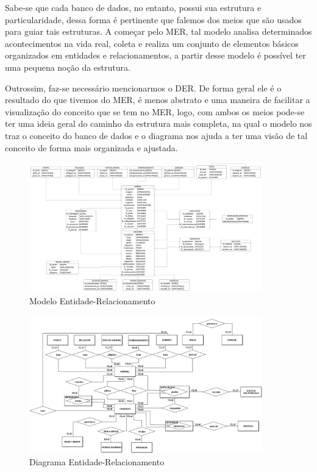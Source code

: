 Sabe-se que cada banco de dados, no entanto, possui sua estrutura e particularidade, dessa forma é pertinente que falemos dos meios que são usados para guiar tais estruturas. A começar pelo \ac{MER}, tal modelo analisa determinados acontecimentos na vida real, coleta e realiza um conjunto de elementos básicos organizados em entidades e relacionamentos, a partir desse modelo é possível ter uma pequena noção da estrutura.

Outrossim, faz-se necessário mencionarmos o \ac{DER}. De forma geral ele é o resultado do que tivemos do \ac{MER}, é menos abstrato e uma maneira de facilitar a visualização do conceito que se tem no \ac{MER}, logo, com ambos os meios pode-se ter uma ideia geral do caminho da estrutura mais completa, na qual o modelo nos traz o conceito do banco de dados e o diagrama nos ajuda a ter uma visão de tal conceito de forma mais organizada e ajustada.

\begin{figure}
    \centering
	\caption{\label{mer}Modelo Entidade-Relacionamento}
	\includegraphics[width=0.9\textwidth]{imagens/MODELOLOGICO.png}
\end{figure}

\begin{figure}
    \centering
	\caption{\label{der}Diagrama Entidade-Relacionamento}
	\includegraphics[width=0.9\textwidth]{imagens/MODELOCONCEITUAL.png}
\end{figure}

